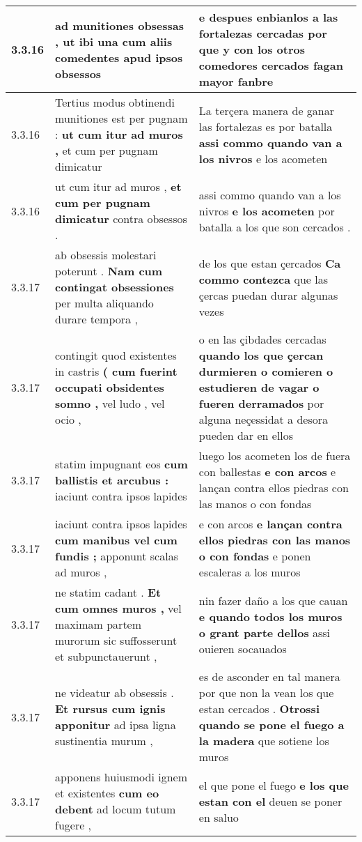 \begin{tabular}{|p{1cm}|p{6.5cm}|p{6.5cm}|}
3.3.16 & ad munitiones obsessas , \textbf{ ut ibi una cum aliis comedentes } apud ipsos obsessos & e despues enbianlos a las fortalezas cercadas \textbf{ por que y con los otros comedores cercados } fagan mayor fanbre \\\hline
3.3.16 & Tertius modus obtinendi munitiones est per pugnam : \textbf{ ut cum itur ad muros , } et cum per pugnam dimicatur & La terçera manera de ganar las fortalezas es por batalla \textbf{ assi commo quando van a los nivros } e los acometen \\\hline
3.3.16 & ut cum itur ad muros , \textbf{ et cum per pugnam dimicatur } contra obsessos . & assi commo quando van a los nivros \textbf{ e los acometen } por batalla a los que son cercados . \\\hline
3.3.17 & ab obsessis molestari poterunt . \textbf{ Nam cum contingat obsessiones } per multa aliquando durare tempora , & de los que estan çercados \textbf{ Ca commo contezca } que las çercas puedan durar algunas vezes \\\hline
3.3.17 & contingit quod existentes in castris \textbf{ ( cum fuerint occupati obsidentes somno , } vel ludo , vel ocio , & o en las çibdades cercadas \textbf{ quando los que çercan durmieren o comieren o estudieren de vagar o fueren derramados } por alguna neçessidat a desora pueden dar en ellos \\\hline
3.3.17 & statim impugnant eos \textbf{ cum ballistis et arcubus : } iaciunt contra ipsos lapides & luego los acometen los de fuera con ballestas \textbf{ e con arcos } e lançan contra ellos piedras con las manos o con fondas \\\hline
3.3.17 & iaciunt contra ipsos lapides \textbf{ cum manibus vel cum fundis ; } apponunt scalas ad muros , & e con arcos \textbf{ e lançan contra ellos piedras con las manos o con fondas } e ponen escaleras a los muros \\\hline
3.3.17 & ne statim cadant . \textbf{ Et cum omnes muros , } vel maximam partem murorum sic suffosserunt et subpunctauerunt , & nin fazer daño a los que cauan \textbf{ e quando todos los muros o grant parte dellos } assi ouieren socauados \\\hline
3.3.17 & ne videatur ab obsessis . \textbf{ Et rursus cum ignis apponitur } ad ipsa ligna sustinentia murum , & es de asconder en tal manera por que non la vean los que estan cercados . \textbf{ Otrossi quando se pone el fuego a la madera } que sotiene los muros \\\hline
3.3.17 & apponens huiusmodi ignem et existentes \textbf{ cum eo debent } ad locum tutum fugere , & el que pone el fuego \textbf{ e los que estan con el } deuen se poner en saluo \\\hline

\end{tabular}
